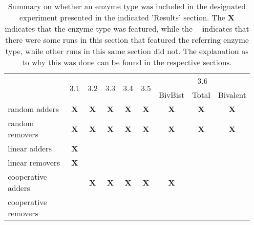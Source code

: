             \begin{table}
                \centering
                \caption{Summary on whether an enzyme type was included in the designated experiment presented in the indicated 'Results' section. The \textbf{X} indicates that the enzyme type was featured, while the \textbf{~} indicates that there were some runs in this section that featured the referring enzyme type, while other runs in this same section did not. The explanation as to why this was done can be found in the respective sections.}
                \begin{tabular}{l|c|c|c|c|c|c|c|c|}
                                            & \multirow{2}{*}{3.1} & \multirow{2}{*}{3.2} & \multirow{2}{*}{3.3} & \multirow{2}{*}{3.4} & \multirow{2}{*}{3.5} & \multicolumn{3}{c|}{3.6}                        \\
                                            &                      &                      &                      &                      &                      & BivBist & Total      & Bivalent    \\\hline
                random adders               & \textbf{X}           & \textbf{X}           & \textbf{X}           & \textbf{X}           & \textbf{X}           & \textbf{X}          & \textbf{X} & \textbf{X}  \\\hline
                random removers             & \textbf{X}           & \textbf{X}           & \textbf{X}           & \textbf{X}           & \textbf{X}           & \textbf{X}          & \textbf{X} & \textbf{X}  \\\hline
                linear adders               & \textbf{X}           &                      &                      &                      &                      &                     &            &             \\\hline
                linear removers             & \textbf{X}           &                      &                      &                      &                      &                     &            &             \\\hline
                cooperative adders          &                      & \textbf{X}           & \textbf{X}           & \textbf{X}           & \textbf{X}           & \textbf{X}          &            &             \\\hline
                cooperative removers        &                      & \textbf{~}          & \textbf{~}          &                      &                      & \textbf{~}         &            &             \\\hline

\end{tabular}
\end{table}

